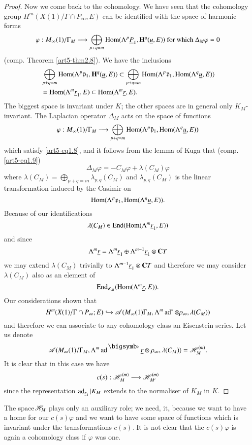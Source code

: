 \begin{proof}
Now we come back to the cohomology. We have seen that the cohomology group $H^m (X (1)/ \Gamma \cap P_\infty, E)$ can be identified with the space of harmonic forms
$$
\varphi: M_\infty (1)/ \Gamma_M \longrightarrow \bigoplus_{p+q=m} \operatorname{Hom} (\Lambda^p \underline{P}_1, \mathbf{H}^q (\underline{u}, E)) \text{ for which } \Delta_M \varphi = 0
$$\pageoriginale
(comp. Theorem \ref{art5-thm2.8}). We have the inclusions
\begin{align*}
& \bigoplus_{p+q=m} \operatorname{Hom} (\Lambda^p \bar{\mathfrak{p}}_1, \mathbf{H}^q (\underline{u}, E)) \subset \bigoplus_{p+q = m} \operatorname{Hom} (\Lambda^p \bar{\mathfrak{p}}_1, \operatorname{Hom} (\Lambda^q \underline{u}, E))\\
& = \operatorname{Hom} (\Lambda^m \underline{r}_1, E) \subset \operatorname{Hom} (\Lambda^m \underline{r}, E).
\end{align*}
The biggest space is invariant under $K$; the other spaces are in general only $K_M$-invariant. The Laplacian operator $\Delta_M$ acts on the space of functions 
$$
\varphi : M_\infty (1) / \Gamma_M \longrightarrow \bigoplus_{p+q = m} \operatorname{Hom} (\Lambda^p \bar{\mathfrak{p}}_1, \operatorname{Hom} (\Lambda^q \underline{u}, E))
$$
which satisfy \eqref{art5-eq1.8}, and it follows from the lemma of Kuga that (comp. \eqref{art5-eq1.9})
$$
\Delta_M \varphi = - C_M \varphi + \lambda (C_M) \varphi
$$
where $\lambda (C_M) = \bigoplus_{p+q=m} \lambda_{p,q} (C_M)$ and $\lambda_{p,q} (C_M)$ is the linear transformation induced by the Casimir on
$$
\operatorname{Hom} (\Lambda^p \mathfrak{p}_1, \operatorname{Hom} (\Lambda^q \underline{u}, E)).
$$
Because of our identifications
$$
\lambda(C_M) \in \operatorname{End} (\operatorname{Hom} (\Lambda^m \underline{r}_1, E))
$$
and since 
$$
\Lambda^m \underline{r} = \Lambda^m \underline{r}_1 \oplus \Lambda^{m-1} \underline{r}_1 \otimes \mathbf{C} T
$$
we may extend $\lambda (C_M)$ trivially to $\Lambda^{m-1} \underline{r}_1 \otimes \mathbf{C} T$ and therefore we may consider $\lambda (C_M)$ also as an element of 
$$
\operatorname{End}_{K_M} (\operatorname{Hom}(\Lambda^m \underline{r}, E)).
$$
Our considerations shown that 
$$
H^m (X(1)/ \Gamma \cap P_\infty; E) \hookrightarrow \mathscr{A} (M_\infty (1) \Gamma_M, \Lambda^m \operatorname{ad}^\ast \otimes \rho_\infty, \lambda (C_M))
$$
and therefore we can associate to any cohomology class an Eisenstein series. Let us denote
$$
\sA (M_\infty (1)/ \Gamma_M, \Lambda^m \ad^\bigdot \underline{r} \otimes \rho_\infty, \lambda (C_M)) = \sH^{(m)}_M.
$$
It is clear that in this case we have
$$
c(s) : \mathscr{H}^{(m)}_M \longrightarrow \mathscr{H}^{(m)}_{M'}
$$
since the representation $\operatorname{ad}_{\underline{r}_1} | K_M$ extends to the normaliser of $K_M$ in $K$.
\end{proof} 

\begin{remark*}
The space\pageoriginale $\mathscr{H}_M$ plays only an auxiliary role; we need, it, because we want to have a home for our $c(s) \varphi$ and we want to have some space of functions which is invariant under the transformations $c(s)$. It is not clear that the $c(s) \varphi $ is again a cohomology class if $\varphi$ was one.
\end{remark*}

